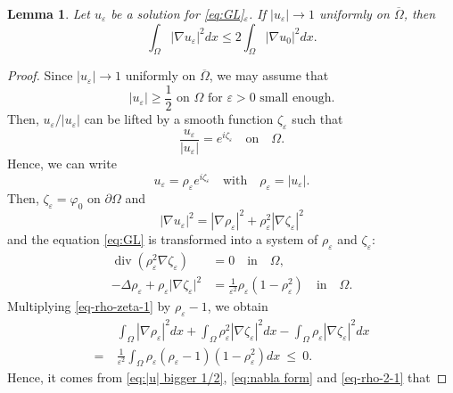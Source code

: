\documentclass[a4paper,10pt,reqno]{amsart}
\newtheorem{lemma}[theorem]{Lemma}
\theoremstyle{definition}
\newcommand{\ve}{{\varepsilon}}
\newcommand{\vp}{{\varphi}}
\newcommand{\Om}{{\Omega}}
\newcommand{\pa}{\partial}
\newcommand{\qin}{{\quad \mbox{in} \quad}}
\newcommand{\qon}{{\quad \mbox{on} \quad}}
\newcommand{\qwith}{{\quad \mbox{with} \quad}}
\numberwithin{equation}{section}
\begin{document}
\smallskip
\begin{lemma}\label{lem:unif conv}
Let  $u_\ve$ be a solution for  \eqref{eq:GL}$_\ve$.
If $|u_\ve| \to 1 $ uniformly on $ \overline\Om $, then
\begin{equation}\label{eq:nabla u L2}
 \int_\Om  |\nabla u_\ve|^2  dx \le 2  \int_\Om  |\nabla u_0|^2  dx .
  \end{equation}
\end{lemma}
%
\begin{proof}
 Since  $|u_\varepsilon| \to 1$ uniformly on $ \overline\Omega$, we may assume that
\begin{equation}\label{eq:|u| bigger 1/2}
 \text{$|u_\varepsilon| \geq \frac{1}{2}$ on  $\Omega$   for $\varepsilon > 0$ small enough.}
\end{equation}
  Then, $u_\varepsilon / |u_\varepsilon|$ can be lifted by a smooth function $\zeta_\varepsilon$ such that
\[
\frac{u_\varepsilon}{|u_\varepsilon|} = e^{i \zeta_\varepsilon} \qon  \Omega.
\]
Hence, we can write
\[
u_\varepsilon = \rho_\varepsilon e^{i \zeta_\varepsilon} \qwith   \rho_\varepsilon = |u_\varepsilon|.
\]
Then,  $\zeta_\ve = \vp_0$ on $\pa \Om$ and
\begin{equation}\label{eq:nabla form}
 |\nabla u_\varepsilon|^2 =    |\nabla \rho_\varepsilon|^2 +  \rho_\varepsilon^2 |\nabla \zeta_\varepsilon|^2
\end{equation}
and    the equation \eqref{eq:GL} is transformed into a system of $\rho_\ve$ and $\zeta_\ve$:
\begin{align}\label{eq-rho-zeta-1}
\operatorname{div}\left( \rho_\varepsilon^2 \nabla \zeta_\varepsilon \right) &= 0 \qin \Omega, \\
\label{eq-rho-zeta-2}
-\Delta \rho_\ve + \rho_\ve\big| \nabla  \zeta_\varepsilon  \big|^2 & = \frac{1}{\ve^2}\rho_\ve(1- \rho_\ve^2) \qin \Om.
\end{align}
Multiplying \eqref{eq-rho-zeta-1} by $\rho_\ve-1$, we obtain
\begin{equation}\label{eq-rho-2-1}
\begin{aligned}
& \int_\Omega |\nabla \rho_\varepsilon|^2  dx +
  \int_\Omega\rho_\ve^2 |\nabla  \zeta_\varepsilon |^2  dx -   \int_\Omega \rho_\ve  |\nabla  \zeta_\varepsilon |^2   dx \\
=~& \frac{1}{ \ve^2}\int_\Omega \rho_\ve( \rho_\varepsilon - 1)(1- \rho_\ve^2) dx  ~\leq~ 0.
\end{aligned}
\end{equation}
Hence, it comes from \eqref{eq:|u| bigger 1/2}, \eqref{eq:nabla form} and \eqref{eq-rho-2-1} that

\end{proof}
\end{document}
